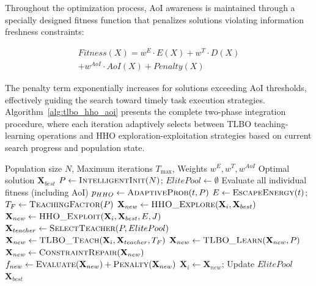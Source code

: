\documentclass[conference]{IEEEtran}
\begin{document}
Throughout the optimization process, AoI awareness is maintained through a specially designed fitness function that penalizes solutions violating information freshness constraints:

\begin{equation}
    \begin{split}
        Fitness(X) = w^E \cdot E(X) + w^T \cdot D(X) \\ 
        + w^{AoI} \cdot AoI(X) + Penalty(X) 
    \end{split} 
    \label{con:Fitness}
\end{equation}

The penalty term exponentially increases for solutions exceeding AoI thresholds, effectively guiding the search toward timely task execution strategies. Algorithm~\ref{alg:tlbo_hho_aoi} presents the complete two-phase integration procedure, where each iteration adaptively selects between TLBO teaching-learning operations and HHO exploration-exploitation strategies based on current search progress and population state.

\begin{algorithm}[!t]
  \small
  \caption{TLBO-HHO Two-Phase Integration Algorithm (with AoI Optimization)}
  \label{alg:tlbo_hho_aoi}
  \begin{algorithmic}[1]
    \REQUIRE Population size $N$, Maximum iterations $T_{\max}$, Weights $w^E, w^T, w^{AoI}$
    \ENSURE Optimal solution $\mathbf{X}_{best}$
    \STATE $P \leftarrow \textsc{IntelligentInit}(N)$; $ElitePool \leftarrow \emptyset$
    \STATE Evaluate all individual fitness (including AoI)
        \STATE $p_{HHO} \leftarrow \textsc{AdaptiveProb}(t, P)$
        \STATE $E \leftarrow \textsc{EscapeEnergy}(t)$; $T_F \leftarrow \textsc{TeachingFactor}(P)$
                    \STATE $\mathbf{X}_{new} \leftarrow \textsc{HHO\_Explore}(\mathbf{X}_i, \mathbf{X}_{best})$
                \ELSE
                    \STATE $\mathbf{X}_{new} \leftarrow \textsc{HHO\_Exploit}(\mathbf{X}_i, \mathbf{X}_{best}, E, J)$
                \ENDIF
            \ELSE
                \STATE $\mathbf{X}_{teacher} \leftarrow \textsc{SelectTeacher}(P, ElitePool)$
                \STATE $\mathbf{X}_{new} \leftarrow \textsc{TLBO\_Teach}(\mathbf{X}_i, \mathbf{X}_{teacher}, T_F)$
                \STATE $\mathbf{X}_{new} \leftarrow \textsc{TLBO\_Learn}(\mathbf{X}_{new}, P)$
            \ENDIF
            \STATE $\mathbf{X}_{new} \leftarrow \textsc{ConstraintRepair}(\mathbf{X}_{new})$
            \STATE $f_{new} \leftarrow \textsc{Evaluate}(\mathbf{X}_{new}) + \textsc{Penalty}(\mathbf{X}_{new})$
                \STATE $\mathbf{X}_i \leftarrow \mathbf{X}_{new}$; Update $ElitePool$
            \ENDIF
        \ENDFOR
    \ENDFOR
    \RETURN $\mathbf{X}_{best}$
  \end{algorithmic}
\end{algorithm}
\end{document}
